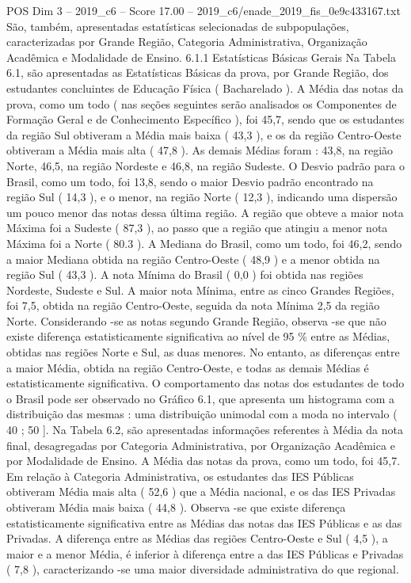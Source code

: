 \begin{textsample}{POS Dim 3 – 2019\_c6 – Score 17.00 – 2019\_c6/enade\_2019\_fis\_0e9c433167.txt}
São, também, apresentadas estatísticas selecionadas de subpopulações, caracterizadas por Grande Região, Categoria Administrativa, Organização Acadêmica e Modalidade de Ensino. 6.1.1 Estatísticas Básicas Gerais Na Tabela 6.1, são apresentadas as Estatísticas Básicas da prova, por Grande Região, dos estudantes concluintes de Educação Física ( Bacharelado ).
A Média das notas da prova, como um todo ( nas seções seguintes serão analisados os Componentes de Formação Geral e de Conhecimento Específico ), foi 45,7, sendo que os estudantes da região Sul obtiveram a Média mais baixa ( 43,3 ), e os da região Centro-Oeste obtiveram a Média mais alta ( 47,8 ).
As demais Médias foram : 43,8, na região Norte, 46,5, na região Nordeste e 46,8, na região Sudeste.
O Desvio padrão para o Brasil, como um todo, foi 13,8, sendo o maior Desvio padrão encontrado na região Sul ( 14,3 ), e o menor, na região Norte ( 12,3 ), indicando uma dispersão um pouco menor das notas dessa última região.
A região que obteve a maior nota Máxima foi a Sudeste ( 87,3 ), ao passo que a região que atingiu a menor nota Máxima foi a Norte ( 80.3 ).
A Mediana do Brasil, como um todo, foi 46,2, sendo a maior Mediana obtida na região Centro-Oeste ( 48,9 ) e a menor obtida na região Sul ( 43,3 ).
A nota Mínima do Brasil ( 0,0 ) foi obtida nas regiões Nordeste, Sudeste e Sul.
A maior nota Mínima, entre as cinco Grandes Regiões, foi 7,5, obtida na região Centro-Oeste, seguida da nota Mínima 2,5 da região Norte.
Considerando -se as notas segundo Grande Região, observa -se que não existe diferença estatisticamente significativa ao nível de 95 \% entre as Médias, obtidas nas regiões Norte e Sul, as duas menores.
No entanto, as diferenças entre a maior Média, obtida na região Centro-Oeste, e todas as demais Médias é estatisticamente significativa.
O comportamento das notas dos estudantes de todo o Brasil pode ser observado no Gráfico 6.1, que apresenta um histograma com a distribuição das mesmas : uma distribuição unimodal com a moda no intervalo ( 40 ; 50 ].
Na Tabela 6.2, são apresentadas informações referentes à Média da nota final, desagregadas por Categoria Administrativa, por Organização Acadêmica e por Modalidade de Ensino.
A Média das notas da prova, como um todo, foi 45,7.
Em relação à Categoria Administrativa, os estudantes das IES Públicas obtiveram Média mais alta ( 52,6 ) que a Média nacional, e os das IES Privadas obtiveram Média mais baixa ( 44,8 ).
Observa -se que existe diferença estatisticamente significativa entre as Médias das notas das IES Públicas e as das Privadas.
A diferença entre as Médias das regiões Centro-Oeste e Sul ( 4,5 ), a maior e a menor Média, é inferior à diferença entre a das IES Públicas e Privadas ( 7,8 ), caracterizando -se uma maior diversidade administrativa do que regional.

\end{textsample}
